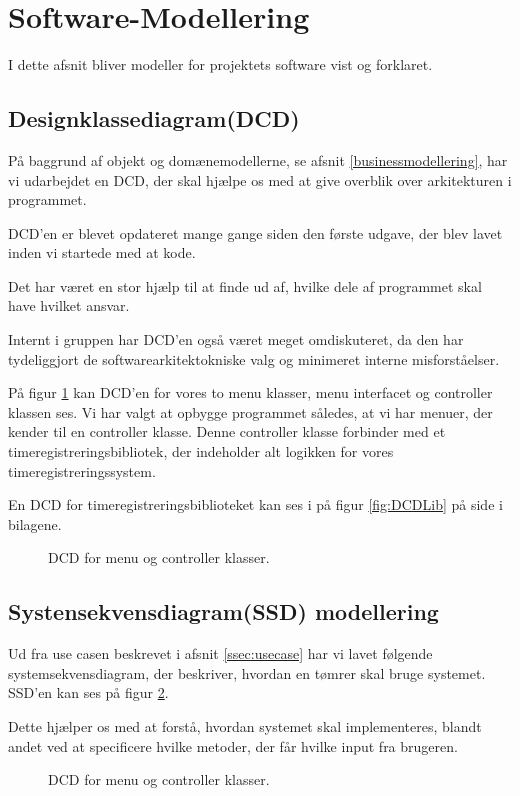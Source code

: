 \section{Software-Modellering}\label{softwaremodellering}
I dette afsnit bliver modeller  for projektets software vist og forklaret.
\subsection{Designklassediagram(DCD)}

På baggrund af objekt og domænemodellerne, se afsnit \ref{businessmodellering}, har vi udarbejdet en DCD, der skal hjælpe os med at give overblik over arkitekturen i programmet.

DCD'en er blevet opdateret mange gange siden den første udgave, der blev lavet inden vi startede med at kode.

Det har været en stor hjælp til at finde ud af, hvilke dele af programmet skal have hvilket ansvar.

Internt i gruppen har DCD'en også været meget omdiskuteret, da den har tydeliggjort de softwarearkitektokniske valg og minimeret interne misforståelser.


På figur \ref{fig:DCDMenu} kan DCD'en for vores to menu klasser, menu interfacet og controller klassen ses.
Vi har valgt at opbygge programmet således, at vi har menuer, der kender til en controller klasse.
Denne controller klasse forbinder med et timeregistreringsbibliotek, der indeholder alt logikken for vores timeregistreringssystem.

En DCD for timeregistreringsbiblioteket kan ses i på figur \ref{fig:DCDLib} på side \pageref{fig:DCDLib} i bilagene.

\begin{figure}[H]
    \caption{DCD for menu og controller klasser.}
    \label{fig:DCDMenu}
\end{figure}

\subsection{Systensekvensdiagram(SSD) modellering}

Ud fra use casen beskrevet i afsnit \ref{ssec:usecase} har vi lavet følgende systemsekvensdiagram, der beskriver, hvordan en tømrer skal bruge systemet. SSD'en kan ses på figur \ref{fig:SSDMain}.

Dette hjælper os med at forstå, hvordan systemet skal implementeres, blandt andet ved at specificere hvilke metoder, der får hvilke input fra brugeren.
\begin{figure}[H]
    \caption{DCD for menu og controller klasser.}
    \label{fig:SSDMain}
\end{figure}

